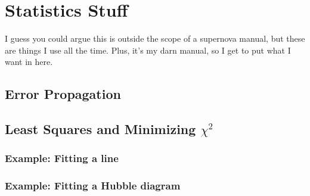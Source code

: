 \section{Statistics Stuff}
I guess you could argue this is outside the scope of a supernova manual, but these are things I use all the time. Plus, it's my darn manual, so I get to put what I want in here.

\subsection{Error Propagation}
\subsection{Least Squares and Minimizing $\chi^{2}$}
\subsubsection{Example: Fitting a line}
\subsubsection{Example: Fitting a Hubble diagram}